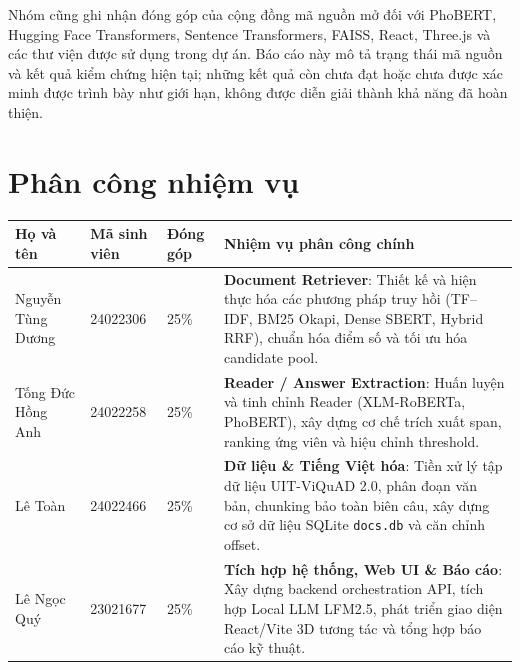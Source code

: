 \documentclass[12pt,a4paper,oneside]{report}
\newcommand{\code}[1]{\texttt{#1}}
\begin{document}
Nhóm cũng ghi nhận đóng góp của cộng đồng mã nguồn mở đối với PhoBERT, Hugging
Face Transformers, Sentence Transformers, FAISS, React, Three.js và các thư viện
được sử dụng trong dự án. Báo cáo này mô tả trạng thái mã nguồn và kết quả kiểm
chứng hiện tại; những kết quả còn chưa đạt hoặc chưa được xác minh được trình bày
như giới hạn, không được diễn giải thành khả năng đã hoàn thiện.

\chapter*{Phân công nhiệm vụ}

\begin{table}[H]
\centering
\begin{tabularx}{\textwidth}{L{3.8cm}C{2.3cm}C{1.8cm}Y}
\toprule
\textbf{Họ và tên} & \textbf{Mã sinh viên} & \textbf{Đóng góp} & \textbf{Nhiệm vụ phân công chính} \\
\midrule
Nguyễn Tùng Dương & 24022306 & 25\% & \textbf{Document Retriever}: Thiết kế và hiện thực hóa các phương pháp truy hồi (TF--IDF, BM25 Okapi, Dense SBERT, Hybrid RRF), chuẩn hóa điểm số và tối ưu hóa candidate pool. \\
\addlinespace[0.3em]
Tống Đức Hồng Anh & 24022258 & 25\% & \textbf{Reader / Answer Extraction}: Huấn luyện và tinh chỉnh Reader (XLM-RoBERTa, PhoBERT), xây dựng cơ chế trích xuất span, ranking ứng viên và hiệu chỉnh threshold. \\
\addlinespace[0.3em]
Lê Toàn & 24022466 & 25\% & \textbf{Dữ liệu \& Tiếng Việt hóa}: Tiền xử lý tập dữ liệu UIT-ViQuAD 2.0, phân đoạn văn bản, chunking bảo toàn biên câu, xây dựng cơ sở dữ liệu SQLite \code{docs.db} và căn chỉnh offset. \\
\addlinespace[0.3em]
Lê Ngọc Quý & 23021677 & 25\% & \textbf{Tích hợp hệ thống, Web UI \& Báo cáo}: Xây dựng backend orchestration API, tích hợp Local LLM LFM2.5, phát triển giao diện React/Vite 3D tương tác và tổng hợp báo cáo kỹ thuật. \\
\bottomrule
\end{tabularx}
\end{table}
\end{document}
